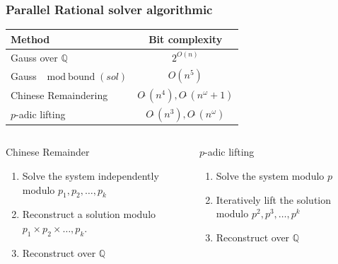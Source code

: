 \documentclass{beamer}
\newcommand{\Q}{\ensuremath{\mathbb{Q}\xspace}}
\newcommand{\GO}[1]{\ensuremath{O(#1)}\xspace}
\newcommand{\SO}[1]{\ensuremath{O\tilde\ (#1)}\xspace}
\begin{document}
\begin{frame}
  \frametitle{Parallel Rational solver algorithmic}
  \begin{center}
    \begin{tabular}{lc}
  \toprule
  Method  & Bit complexity \\
  \midrule
  Gauss over $\mathbb{Q}$ & $2^{\GO{n}}$ \\
  Gauss $\mod \text{bound}(sol)$ & $\GO{n^5}$\\
  Chinese Remaindering %
  & $\SO{n^4}, \SO{n^\omega+1}$\\
  $p$-adic lifting & $\SO{n^3}, \SO{n^\omega}$\\
  \bottomrule
\end{tabular}
  \end{center}

  \begin{columns}
    \begin{column}{.48\textwidth}
      \begin{block}  {Chinese Remainder}
        \begin{enumerate}
        \item Solve the system independently modulo $p_1,p_2,\dots,p_k$
        \item Reconstruct a solution modulo $p_1\times p_2\times \dots,p_k$.
        \item Reconstruct over $\Q$
        \end{enumerate}
      \end{block}
    \end{column}
    \begin{column}{.48\textwidth}
      \begin{block} {$p$-adic lifting}
        \begin{enumerate}
        \item Solve the system modulo $p$
        \item Iteratively lift the solution modulo $p^2,p^3,\dots,p^k$
        \item Reconstruct over $\Q$
        \end{enumerate}
      \end{block}
    \end{column}
  \end{columns}
\end{frame}
\end{document}
